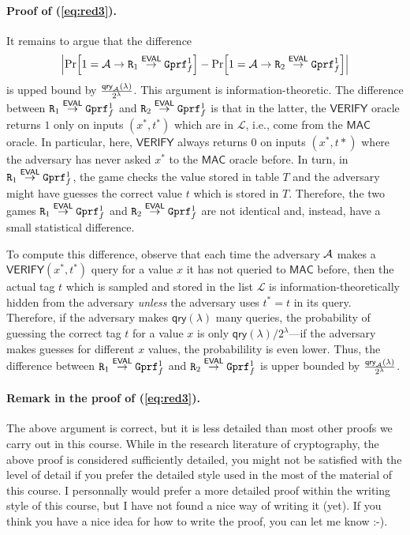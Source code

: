 \documentclass[a4paper,table,dvipsnames]{article}
\theoremstyle{definition}
\newcommand{\M}[1]{\ensuremath{\text{\texttt{#1}}}}
\renewcommand{\O}[1]{\ensuremath{\mathsf{#1}}}
\begin{document}
\paragraph{Proof of (\ref{eq:red3}).} It remains to argue that the difference
\[\abs{\prob{1=\adv\rightarrow\M{R}_1\stackrel{\O{EVAL}}{\rightarrow}\M{Gprf}^1_f}-\prob{1=\adv\rightarrow\M{R}_2\stackrel{\O{EVAL}}{\rightarrow}\M{Gprf}^1_f}}\] 
is upped bound by $\frac{\O{qry}_{\adv}(\lambda)}{2^\lambda}$. This argument is information-theoretic. 
The difference between 
$\M{R}_1\stackrel{\O{EVAL}}{\rightarrow}\M{Gprf}^1_f$ and 
$\M{R}_2\stackrel{\O{EVAL}}{\rightarrow}\M{Gprf}^1_f$ is that 
in the latter, the  $\O{VERIFY}$ oracle returns $1$ only on inputs
$(x^*,t^*)$ which are in $\mathcal{L}$, i.e., come from the $\O{MAC}$
oracle. In particular, here, $\O{VERIFY}$ always returns $0$
on inputs $(x^*,t *)$ where the adversary has never asked $x^*$ to
the $\O{MAC}$ oracle before. In turn, in 
$\M{R}_1\stackrel{\O{EVAL}}{\rightarrow}\M{Gprf}^1_f$,
the game checks the value stored in table $T$ and the
adversary might have guesses the correct value $t$
which is stored in $T$. Therefore, the two games 
$\M{R}_1\stackrel{\O{EVAL}}{\rightarrow}\M{Gprf}^1_f$ and 
$\M{R}_2\stackrel{\O{EVAL}}{\rightarrow}\M{Gprf}^1_f$
are not identical and, instead, have a small statistical difference.

To compute this difference, observe that each time the adversary $\mathcal{A}$ makes a $\O{VERIFY}(x^*,t^*)$ query for a value $x$ it has not queried to $\O{MAC}$
before, then the actual tag $t$ which is sampled and stored in the list $\mathcal{L}$ is information-theoretically
hidden from the adversary \emph{unless} the adversary uses $t^*=t$ in its query. Therefore, if
the adversary makes $\mathsf{qry}(\lambda)$ many queries, the probability of guessing the
correct tag $t$ for a value $x$ is only $\mathsf{qry}(\lambda)/2^\lambda$---if the adversary
makes guesses for different $x$ values, the probabilility is even lower. Thus, the
difference between
$\M{R}_1\stackrel{\O{EVAL}}{\rightarrow}\M{Gprf}^1_f$ and 
$\M{R}_2\stackrel{\O{EVAL}}{\rightarrow}\M{Gprf}^1_f$ is upper bounded by
$\frac{\O{qry}_{\adv}(\lambda)}{2^\lambda}$.


\paragraph{Remark in the proof of (\ref{eq:red3}).} The above argument is correct,
but it is less detailed than most other proofs we carry out in this course. While
in the research literature of cryptography, the above proof is considered sufficiently
detailed, you might not be satisfied with the level of detail if you prefer the detailed
style used in the most of the material of this course. I personnally would prefer a more
detailed proof within the writing style of this course, but I have not found a nice way
of writing it (yet). If you think you have a nice idea for how to write the proof, you
can let me know :-).
\end{document}
